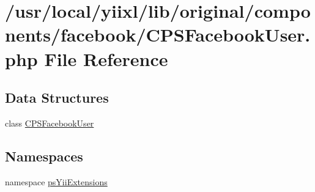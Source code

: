 \hypertarget{CPSFacebookUser_8php}{
\section{/usr/local/yiixl/lib/original/components/facebook/CPSFacebookUser.php File Reference}
\label{CPSFacebookUser_8php}
}
\subsection*{Data Structures}
\begin{DoxyCompactItemize}
\item 
class \hyperlink{classCPSFacebookUser}{CPSFacebookUser}
\end{DoxyCompactItemize}
\subsection*{Namespaces}
\begin{DoxyCompactItemize}
\item 
namespace \hyperlink{namespacepsYiiExtensions}{psYiiExtensions}
\end{DoxyCompactItemize}

